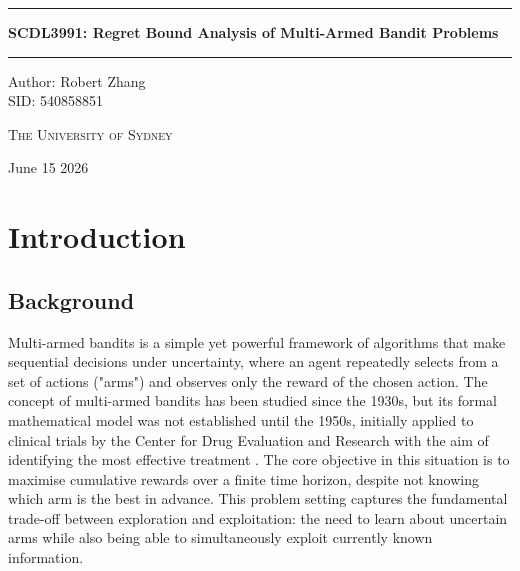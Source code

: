 \documentclass[12pt]{article}
\begin{document}
\begin{titlepage}
    \centering
    
    \vspace*{2cm}
    
    \noindent\rule{\linewidth}{0.8pt}
    
    \vspace{0.5cm}
    
    {\large\textbf{SCDL3991: Regret Bound Analysis of Multi-Armed Bandit Problems}}
    
    \vspace{0.5cm}
    
    \noindent\rule{\linewidth}{0.8pt}
    
    \vspace{4cm}
    
    Author: Robert Zhang \\
    SID: 540858851
    
    \vspace{3cm}
    
    {\large\textsc{The University of Sydney}}
    
    \vspace{1.5cm}
    
    June 15 2026
    
\end{titlepage}

\setcounter{page}{1}  %
\tableofcontents
\newpage

\section{Introduction}

\subsection{Background}

Multi-armed bandits is a simple yet powerful framework of algorithms that make sequential decisions under uncertainty, where an agent repeatedly selects from a set of actions ("arms") and observes only the reward of the chosen action. The concept of multi-armed bandits has been studied since the 1930s, but its formal mathematical model was not established until the 1950s,  initially applied to clinical trials by the Center for Drug Evaluation and Research with the aim of identifying the most effective treatment \cite{article1}. The core objective in this situation is to maximise cumulative rewards over a finite time horizon, despite not knowing which arm is the best in advance. This problem setting captures the fundamental trade-off between exploration and exploitation: the need to learn about uncertain arms while also being able to simultaneously exploit currently known information. 
\end{document}
